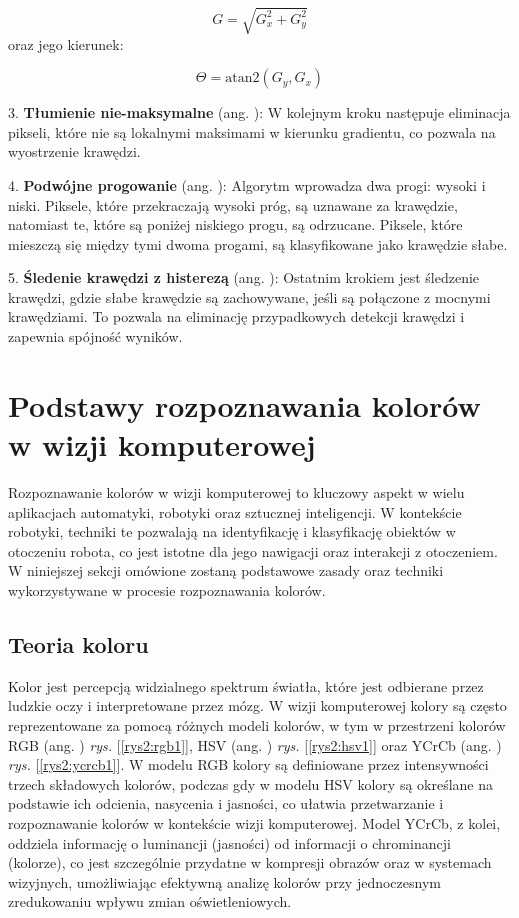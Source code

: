 \[
G = \sqrt{G_x^2 + G_y^2}
\]
oraz jego kierunek:

\[
\Theta = \text{atan2}(G_y, G_x)
\]

3. \textbf{Tłumienie nie-maksymalne} (ang. ): W kolejnym kroku następuje eliminacja pikseli, które nie są lokalnymi maksimami w kierunku gradientu, co pozwala na wyostrzenie krawędzi.

4. \textbf{Podwójne progowanie} (ang. ): Algorytm wprowadza dwa progi: wysoki i niski. Piksele, które przekraczają wysoki próg, są uznawane za krawędzie, natomiast te, które są poniżej niskiego progu, są odrzucane. Piksele, które mieszczą się między tymi dwoma progami, są klasyfikowane jako krawędzie słabe.

5. \textbf{Śledenie krawędzi z histerezą} (ang. ): Ostatnim krokiem jest śledzenie krawędzi, gdzie słabe krawędzie są zachowywane, jeśli są połączone z mocnymi krawędziami. To pozwala na eliminację przypadkowych detekcji krawędzi i zapewnia spójność wyników.

\clearpage

\section{Podstawy rozpoznawania kolorów w wizji komputerowej}

Rozpoznawanie kolorów w wizji komputerowej to kluczowy aspekt w wielu aplikacjach automatyki, robotyki oraz sztucznej inteligencji. W kontekście robotyki, techniki te pozwalają na identyfikację i klasyfikację obiektów w otoczeniu robota, co jest istotne dla jego nawigacji oraz interakcji z otoczeniem. W niniejszej sekcji omówione zostaną podstawowe zasady oraz techniki wykorzystywane w procesie rozpoznawania kolorów.

\subsection{Teoria koloru}


Kolor jest percepcją widzialnego spektrum światła, które jest odbierane przez ludzkie oczy i interpretowane przez mózg. W wizji komputerowej kolory są często reprezentowane za pomocą różnych modeli kolorów, w tym w przestrzeni kolorów RGB (ang. ) \textit{rys.} [\ref{rys2:rgb1}], HSV (ang. ) \textit{rys.} [\ref{rys2:hsv1}] oraz YCrCb (ang. ) \textit{rys.} [\ref{rys2:ycrcb1}]. W modelu RGB kolory są definiowane przez intensywności trzech składowych kolorów, podczas gdy w modelu HSV kolory są określane na podstawie ich odcienia, nasycenia i jasności, co ułatwia przetwarzanie i rozpoznawanie kolorów w kontekście wizji komputerowej. Model YCrCb, z kolei, oddziela informację o luminancji (jasności) od informacji o chrominancji (kolorze), co jest szczególnie przydatne w kompresji obrazów oraz w systemach wizyjnych, umożliwiając efektywną analizę kolorów przy jednoczesnym zredukowaniu wpływu zmian oświetleniowych.


